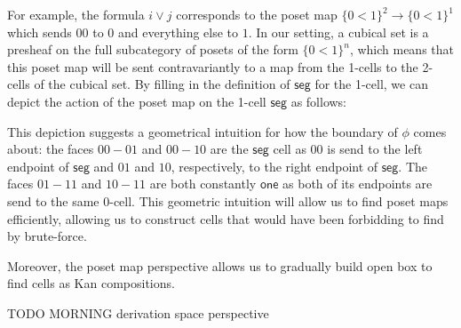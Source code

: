 \documentclass{llncs}
\newcommand{\todo}[1]{
  \begin{tcolorbox}
    TODO {#1} 
  \end{tcolorbox}
}
\newcommand{\cset}[1]{\ensuremath{\mathsf{{#1}}}}
\begin{document}
For example, the formula $i \vee j$ corresponds to the poset map $\{ 0<1 \}^2
\to \{ 0<1 \}^1$ which sends $00$ to $0$ and everything else to $1$. In our
setting, a cubical set
is a presheaf on the full subcategory of posets of the form $\{ 0<1 \}^n$, which
means that this poset map will be sent contravariantly to a map from the 1-cells
to the 2-cells of the cubical set. By filling in the definition of \cset{seg}
for the 1-cell, we can depict the action of the poset map on the 1-cell
\cset{seg} as follows:
\begin{center}
\end{center}

This depiction suggests a geometrical intuition for how the boundary of $\phi$
comes about: the faces $00-01$ and $00-10$ are the
\cset{seg} cell as $00$ is send to the left endpoint of \cset{seg} and $01$ and
$10$, respectively, to the right endpoint of \cset{seg}. The faces $01-11$ and $10-11$
are both constantly \cset{one} as both of its endpoints are send to the same
0-cell. This geometric intuition will allow us to find poset maps
efficiently, allowing us to construct cells that would have been forbidding to
find by brute-force.

Moreover, the poset map perspective allows us to gradually build open box to
find cells as Kan compositions.
\todo{MORNING derivation space perspective}

\end{document}
